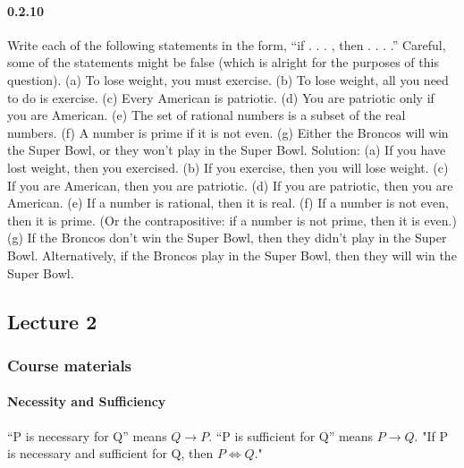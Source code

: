 \documentclass{article}
\begin{document}
\paragraph{0.2.10}
Write each of the following statements in the form, “if . . . , then . . . .”
Careful, some of the statements might be false (which is alright for the
purposes of this question).\newline
(a) To lose weight, you must exercise.\newline
(b) To lose weight, all you need to do is exercise.\newline
(c) Every American is patriotic.\newline
(d) You are patriotic only if you are American.\newline
(e) The set of rational numbers is a subset of the real numbers.\newline
(f) A number is prime if it is not even.\newline
(g) Either the Broncos will win the Super Bowl, or they won’t play
in the Super Bowl.\newline
Solution:\newline
(a) If you have lost weight, then you exercised.\newline
(b) If you exercise, then you will lose weight.\newline
(c) If you are American, then you are patriotic.\newline
(d) If you are patriotic, then you are American.\newline
(e) If a number is rational, then it is real.\newline
(f) If a number is not even, then it is prime. (Or the contrapositive: if a
number is not prime, then it is even.)\newline
(g) If the Broncos don’t win the Super Bowl, then they didn’t play in the
Super Bowl. Alternatively, if the Broncos play in the Super Bowl,
then they will win the Super Bowl.
\subsection{Lecture 2}
\subsubsection{Course materials}
\paragraph{Necessity and Sufficiency}
“P is necessary for Q” means $Q \to P$.\newline
“P is sufficient for Q” means $P \to Q$.\newline
"If P is necessary and sufficient for Q, then $P \Leftrightarrow Q$."
\end{document}
